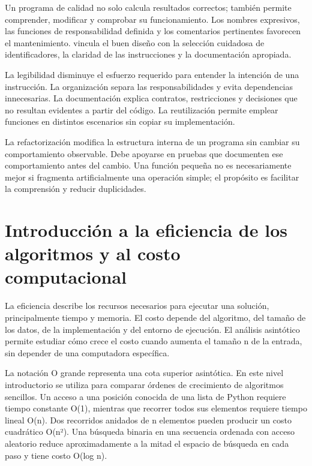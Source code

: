 Un programa de calidad no solo calcula resultados correctos; también permite comprender, modificar y comprobar su funcionamiento. Los nombres expresivos, las funciones de responsabilidad definida y los comentarios pertinentes favorecen el mantenimiento. \textcite[pp.~63–64]{farrell2013} vincula el buen diseño con la selección cuidadosa de identificadores, la claridad de las instrucciones y la documentación apropiada.

La legibilidad disminuye el esfuerzo requerido para entender la intención de una instrucción. La organización separa las responsabilidades y evita dependencias innecesarias. La documentación explica contratos, restricciones y decisiones que no resultan evidentes a partir del código. La reutilización permite emplear funciones en distintos escenarios sin copiar su implementación.

La refactorización modifica la estructura interna de un programa sin cambiar su comportamiento observable. Debe apoyarse en pruebas que documenten ese comportamiento antes del cambio. Una función pequeña no es necesariamente mejor si fragmenta artificialmente una operación simple; el propósito es facilitar la comprensión y reducir duplicidades.




\section{Introducción a la eficiencia de los algoritmos y al costo computacional}

La eficiencia describe los recursos necesarios para ejecutar una solución, principalmente tiempo y memoria. El costo depende del algoritmo, del tamaño de los datos, de la implementación y del entorno de ejecución. El análisis asintótico permite estudiar cómo crece el costo cuando aumenta el tamaño n de la entrada, sin depender de una computadora específica.

La notación O grande representa una cota superior asintótica. En este nivel introductorio se utiliza para comparar órdenes de crecimiento de algoritmos sencillos. Un acceso a una posición conocida de una lista de Python requiere tiempo constante O(1), mientras que recorrer todos sus elementos requiere tiempo lineal O(n). Dos recorridos anidados de n elementos pueden producir un costo cuadrático O(n²). Una búsqueda binaria en una secuencia ordenada con acceso aleatorio reduce aproximadamente a la mitad el espacio de búsqueda en cada paso y tiene costo O(log n).

